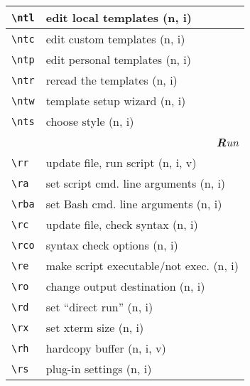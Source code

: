 \documentclass[oneside,11pt,landscape,DIV16]{scrartcl}
\begin{document}
\begin{multicols}{3}
\begin{center}
\begin{tabular}[]{|p{11mm}|p{62mm}|}
%
\hline \verb'\ntl' & edit local templates      \hfill (n, i)\\
\hline \verb'\ntc' & edit custom templates     \hfill (n, i)\\
\hline \verb'\ntp' & edit personal templates   \hfill (n, i)\\
\hline \verb'\ntr' & reread the templates      \hfill (n, i)\\
\hline \verb'\ntw' & template setup wizard     \hfill (n, i)\\
\hline \verb'\nts' & choose style              \hfill (n, i)\\
\hline
\hline
\multicolumn{2}{|r|}{\textsl{\textbf{R}un}} \\[1.0ex]
\hline \verb'\rr'  & update file, run script              \hfill (n, i, v)\\
\hline \verb'\ra'  & set script cmd. line arguments       \hfill (n, i)\\
\hline \verb'\rba' & set Bash cmd. line arguments         \hfill (n, i)\\
\hline \verb'\rc'  & update file, check syntax            \hfill (n, i)\\
\hline \verb'\rco' & syntax check options                 \hfill (n, i)\\
\hline \verb'\re'  & make script executable/not exec.     \hfill (n, i)\\
\hline \verb'\ro'  & change output destination            \hfill (n, i)\\
\hline \verb'\rd'  & set ``direct run''                   \hfill (n, i)\\
\hline \verb'\rx'  & set xterm size                       \hfill (n, i)\\
\hline \verb'\rh'  & hardcopy buffer                      \hfill (n, i, v)\\
\hline \verb'\rs'  & plug-in settings                     \hfill (n, i)\\
\hline
\end{tabular}\\
%
%
\end{center}%
\end{multicols}%
%
\end{document}
